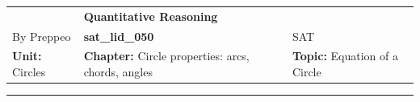 \documentclass[11pt,paper=a4,answers]{exam}
\begin{document}
\begin{center}
    \centering
    \renewcommand{\arraystretch}{1.5}
    \begin{tabularx}{\textwidth}{YYY}
    & \normalsize\bf{{\Large{{Quantitative Reasoning}}}} & \\
    By Preppeo & \normalsize\bf{{sat\_lid\_050}} & SAT\\
    \normalsize{{\textbf{{Unit:}} Circles}} & \normalsize{{\textbf{{Chapter:}} Circle properties: arcs, chords, angles}} & \normalsize{{\textbf{{Topic:}} Equation of a Circle}} \\
    \end{tabularx}
\end{center}
\par\noindent\rule{\textwidth}{1pt}
\end{document}
